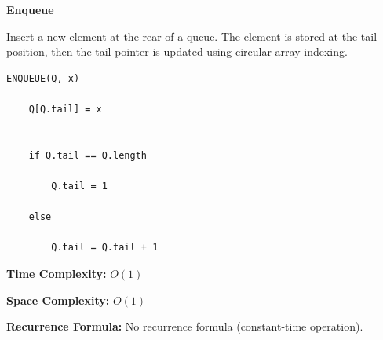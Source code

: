 \documentclass[a4paper,12pt]{article}
\begin{document}
\begin{tcolorbox}[
    colback=gray!30,
    colframe=black,
    boxrule=1pt,
    arc=0mm
]

\begin{tcolorbox}[
    colback=gray!10,
    colframe=black,
    arc=0mm
]
\centering
{\Huge\bfseries Enqueue}
\end{tcolorbox}


\begin{tcolorbox}[
    colback=gray!10,
    colframe=black,
    arc=0mm
]
\small
Insert a new element at the rear of a queue.
The element is stored at the tail position, then the tail pointer
is updated using circular array indexing.
\end{tcolorbox}


\begin{tcolorbox}[
    colback=black!5,
    colframe=black,
    arc=0mm,
    title=Pseudo-code
]
\tiny
\begin{lstlisting}
ENQUEUE(Q, x)

    Q[Q.tail] = x


    if Q.tail == Q.length

        Q.tail = 1

    else

        Q.tail = Q.tail + 1
\end{lstlisting}
\end{tcolorbox}


\begin{tcolorbox}[
    colback=cyan!20,
    colframe=black,
    arc=0mm
]
\small
\textbf{Time Complexity:}
$O(1)$
\end{tcolorbox}


\begin{tcolorbox}[
    colback=violet!20,
    colframe=black,
    arc=0mm
]
\small
\textbf{Space Complexity:}
$O(1)$
\end{tcolorbox}


\begin{tcolorbox}[
    colback=pink!20,
    colframe=black,
    arc=0mm
]
\small
\textbf{Recurrence Formula:}
No recurrence formula (constant-time operation).
\end{tcolorbox}

\end{tcolorbox}
\end{document}
